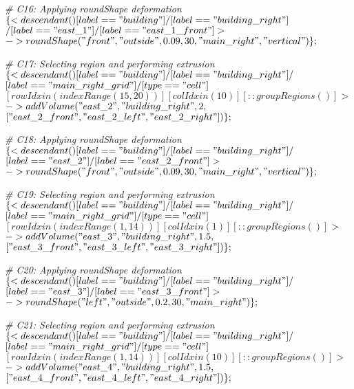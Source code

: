 \noindent \textit{\# C16: Applying roundShape deformation}\\
$\{< descendant() [label=="building"] / [label=="building\_right"] $\\
$/ [label=="east\_1"] / [label=="east\_1\_front"] > $\\
$-> roundShape("front", "outside", 0.09, 30, "main\_right", "vertical")\};$

\noindent \textit{\# C17: Selecting region and performing extrusion}\\
$\{< descendant() [label=="building"] / [label=="building\_right"] / $\\
$[label=="main\_right\_grid"] / [type=="cell"] $\\
$[rowIdx in (indexRange(15, 20))] [colIdx in (10)] [::groupRegions()] > $\\
$-> addVolume("east\_2", "building\_right", 2, $\\
$["east\_2\_front", "east\_2\_left", "east\_2\_right"])\};$

\noindent \textit{\# C18: Applying roundShape deformation}\\
$\{< descendant() [label=="building"] / [label=="building\_right"] / $\\
$[label=="east\_2"] / [label=="east\_2\_front"] > $\\
$-> roundShape("front", "outside", 0.09, 30, "main\_right", "vertical")\};$

\noindent \textit{\# C19: Selecting region and performing extrusion}\\
$\{< descendant() [label=="building"] / [label=="building\_right"] / $\\
$[label=="main\_right\_grid"] / [type=="cell"] $\\
$[rowIdx in (indexRange(1, 14))] [colIdx in (1)] [::groupRegions()] > $\\
$-> addVolume("east\_3", "building\_right", 1.5, $\\
$["east\_3\_front", "east\_3\_left", "east\_3\_right"])\};$

\noindent \textit{\# C20: Applying roundShape deformation}\\
$\{< descendant() [label=="building"] / [label=="building\_right"] / $\\
$[label=="east\_3"] / [label=="east\_3\_front"] > $\\
$-> roundShape("left", "outside", 0.2, 30, "main\_right")\};$

\noindent \textit{\# C21: Selecting region and performing extrusion}\\
$\{< descendant() [label=="building"] / [label=="building\_right"] / $\\
$[label=="main\_right\_grid"] / [type=="cell"] $\\
$[rowIdx in (indexRange(1, 14))] [colIdx in (10)] [::groupRegions()] > $\\
$-> addVolume("east\_4", "building\_right", 1.5, $\\
$["east\_4\_front", "east\_4\_left", "east\_4\_right"])\};$

